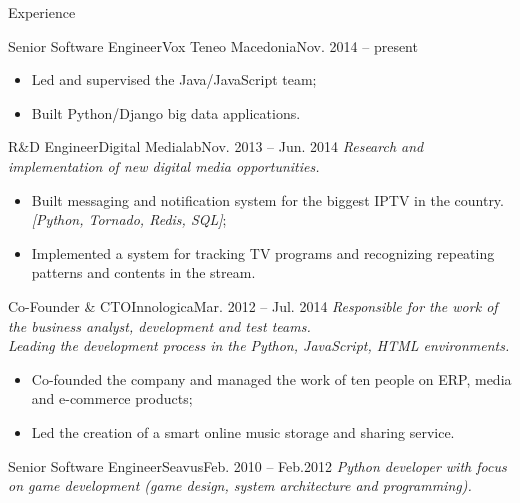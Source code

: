 \documentclass[]{mcdowellcv}
\begin{document}
    \begin{cvsection}{Experience}
    \label{Employment Record}
        \begin{cvsubsection}{Senior Software Engineer}{Vox Teneo Macedonia}{Nov. 2014 -- present}
            \begin{itemize}
                \item Led and supervised the Java/JavaScript team;
                \item Built Python/Django big data applications.
            \end{itemize}
        \end{cvsubsection}
        \begin{cvsubsection}{R\&D Engineer}{Digital Medialab}{Nov. 2013 -- Jun. 2014}
            \textit{Research and implementation of new digital media opportunities.}
            \begin{itemize}
                \item Built messaging and notification system for the biggest IPTV in the country.
                    \textit{[Python, Tornado, Redis, SQL]};
                \item Implemented a system for tracking TV programs and recognizing repeating patterns and contents in the stream.
            \end{itemize}
        \end{cvsubsection}
        \begin{cvsubsection}{Co-Founder \& CTO}{Innologica}{Mar. 2012 -- Jul. 2014}
            \textit{Responsible for the work of the business analyst, development and test teams.}\\
            \textit{Leading the development process in the Python, JavaScript, HTML environments.}
            \begin{itemize}
                \item Co-founded the company and managed the work of ten people on ERP, media and e-commerce products;
                \item Led the creation of a smart online music storage and sharing service.
            \end{itemize}
        \end{cvsubsection}
        \begin{cvsubsection}{Senior Software Engineer}{Seavus}{Feb. 2010 -- Feb.2012}
            \textit{Python developer with focus on game development (game design, system architecture and programming).}
            \begin{itemize}

\end{itemize}
\end{cvsubsection}
\end{cvsection}
\end{document}
